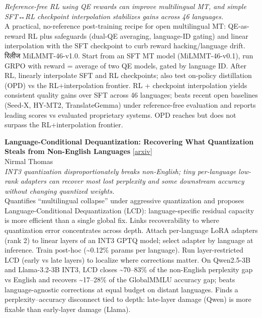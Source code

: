 \documentclass[12pt,letterpaper]{article}
\begin{document}
{\small\textit{Reference-free RL using QE rewards can improve multilingual MT, and simple SFT↔RL checkpoint interpolation stabilizes gains across 46 languages.}}\\[1pt]
{\footnotesize A practical, no-reference post-training recipe for open multilingual MT: QE-as-reward RL plus safeguards (dual-QE averaging, language-ID gating) and linear interpolation with the SFT checkpoint to curb reward hacking/language drift. रिलीज MiLMMT-46-v1.0. Start from an SFT MT model (MiLMMT-46-v0.1), run GRPO with reward = average of two QE models, gated by language ID. After RL, linearly interpolate SFT and RL checkpoints; also test on-policy distillation (OPD) vs the RL+interpolation frontier. RL + checkpoint interpolation yields consistent quality gains over SFT across 46 languages; beats recent open baselines (Seed-X, HY-MT2, TranslateGemma) under reference-free evaluation and reports leading scores vs evaluated proprietary systems. OPD reaches but does not surpass the RL+interpolation frontier.}

\medskip

{\small\textbf{Language-Conditional Dequantization: Recovering What Quantization Steals from Non-English Languages}} {\scriptsize[\href{https://arxiv.org/abs/2608.11786}{arxiv}]}\\
{\scriptsize Nirmal Thomas}\\

{\small\textit{INT3 quantization disproportionately breaks non-English; tiny per-language low-rank adapters can recover most lost perplexity and some downstream accuracy without changing quantized weights.}}\\[1pt]
{\footnotesize Quantifies ``multilingual collapse'' under aggressive quantization and proposes Language-Conditional Dequantization (LCD): language-specific residual capacity is more efficient than a single global fix. Links recoverability to where quantization error concentrates across depth. Attach per-language LoRA adapters (rank 2) to linear layers of an INT3 GPTQ model; select adapter by language at inference. Train post-hoc (\textasciitilde{}0.12\% params per language). Run layer-restricted LCD (early vs late layers) to localize where corrections matter. On Qwen2.5-3B and Llama-3.2-3B INT3, LCD closes \textasciitilde{}70--83\% of the non-English perplexity gap vs English and recovers \textasciitilde{}17--28\% of the GlobalMMLU accuracy gap; beats language-agnostic corrections at equal budget on distant languages. Finds a perplexity--accuracy disconnect tied to depth: late-layer damage (Qwen) is more fixable than early-layer damage (Llama).}
\end{document}
